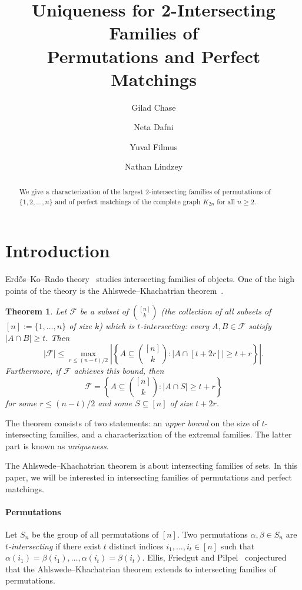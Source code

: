 \documentclass{article}
\title{Uniqueness for 2-Intersecting Families of \\ Permutations and Perfect Matchings}
\author{Gilad Chase}
\author{Neta Dafni}
\author{Yuval Filmus}
\author{Nathan Lindzey}
\affil{Technion --- Israel Institute of Technology}
\newtheorem{theorem}{Theorem}[section]
\theoremstyle{definition}
\begin{document}
\maketitle

\begin{abstract}
    We give a characterization of the largest $2$-intersecting families of permutations of $\{1,2,\ldots,n\}$ and of perfect matchings of the complete graph $K_{2n}$ for all $n \geq 2$.
\end{abstract}

\section{Introduction} \label{sec:introduction}

Erd\H{o}s--Ko--Rado theory~\cite{EKR} studies intersecting families of objects. One of the high points of the theory is the Ahlswede--Khachatrian theorem~\cite{AK1,AK2}.

\begin{theorem} \label{thm:AK}
Let $\mathcal{F}$ be a subset of $\binom{[n]}{k}$ (the collection of all subsets of $[n] := \{1,\ldots,n\}$ of size $k$) which is \emph{$t$-intersecting}: every $A,B \in \mathcal{F}$ satisfy $|A \cap B| \geq t$. Then
\[
 |\mathcal{F}| \leq \max_{r \leq (n-t)/2} \left|\left\{ A \subseteq \binom{[n]}{k} : |A \cap [t+2r]| \geq t+r \right\}\right|.
\]
Furthermore, if $\mathcal{F}$ achieves this bound, then
\[
 \mathcal{F} = \left\{ A \subseteq \binom{[n]}{k} : |A \cap S| \geq t+r \right\}
\]
for some $r \le (n-t)/2$ and some $S \subseteq [n]$ of size $t + 2r$.
\end{theorem}

The theorem consists of two statements: an \emph{upper bound} on the size of $t$-intersecting families, and a characterization of the extremal families. The latter part is known as \emph{uniqueness}.

The Ahlswede--Khachatrian theorem is about intersecting families of sets.
In this paper, we will be interested in intersecting families of permutations and perfect matchings. 

\paragraph{Permutations}
Let $S_n$ be the group of all permutations of $[n]$. Two permutations $\alpha,\beta \in S_n$ are \emph{$t$-intersecting} if there exist $t$ distinct indices $i_1,\ldots,i_t \in [n]$ such that $\alpha(i_1) = \beta(i_1),\ldots,\alpha(i_t) = \beta(i_t)$. Ellis, Friedgut and Pilpel~\cite{EFP} conjectured that the Ahlswede--Khachatrian theorem extends to intersecting families of permutations.
\end{document}
